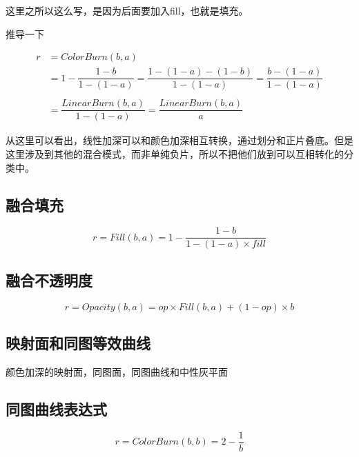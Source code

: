 这里之所以这么写，是因为后面要加入fill，也就是填充。


推导一下

\begin{equation}\begin{aligned}r&=ColorBurn(b,a)\\&=1-\dfrac{1-b}{1-(1-a)}=\dfrac{1-(1-a)-(1-b)}{1-(1-a)}=\dfrac{b-(1-a)}{1-(1-a)}\\&\\&=\dfrac{LinearBurn(b,a)}{1-(1-a)}=\dfrac{LinearBurn(b,a)}{a}\end{aligned}\end{equation}

\begin{notice}
\item 从这里可以看出，线性加深可以和颜色加深相互转换，通过划分和正片叠底。但是这里涉及到其他的混合模式，而非单纯负片，所以不把他们放到可以互相转化的分类中。
\end{notice}


\subsection{ 融合填充}


\begin{equation}r= Fill(b,a) =1-\dfrac{1-b}{1-(1-a)\times fill}\end{equation}

\subsection{ 融合不透明度}


\begin{equation}r=Opacity(b,a)=op\times Fill(b,a)+(1-op)\times b\end{equation}

\subsection{ 映射面和同图等效曲线}

颜色加深的映射面，同图面，同图曲线和中性灰平面


\subsection{ 同图曲线表达式}


\begin{equation} r= ColorBurn(b,b)=2-\dfrac{1}{b}\end{equation}

